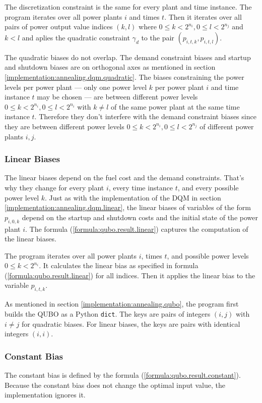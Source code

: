 The discretization constraint is the same for every plant and time instance.
The program iterates over all power plants $i$ and times $t$.
Then it iterates over all pairs of power output value indices $(k, l)$ where $0 \leq k < 2^{n_i}, 0 \leq l < 2^{n_j}$ and $k < l$ and aplies the quadratic constraint $\gamma_d$ to the pair $(p_{i, t, k}, p_{i, t, l})$.

The quadratic biases do not overlap.
The demand constraint biases and startup and shutdown biases are on orthogonal axes as mentioned in section \ref{implementation:annealing.dqm.quadratic}.
The biases constraining the power levels per power plant --- only one power level $k$ per power plant $i$ and time instance $t$ may be chosen --- are between different power levels $0 \leq k < 2^{n_i}, 0 \leq l < 2^{n_i}$ with $k \neq l$ of the same power plant at the same time instance $t$.
Therefore they don't interfere with the demand constraint biases since they are between different power levels $0 \leq k < 2^{n_i}, 0 \leq l < 2^{n_j}$ of different power plants $i, j$.

\subsubsection{Linear Biases}
\label{implementation:annealing.qubo.linear}

The linear biases depend on the fuel cost and the demand constraints.
That's why they change for every plant $i$, every time instance $t$, and every possible power level $k$.
Just as with the implementation of the DQM in section \ref{implementation:annealing.dqm.linear}, the linear biases of variables of the form $p_{i, 0, k}$ depend on the startup and shutdown costs and the initial state of the power plant $i$.
The formula (\ref{formula:qubo.result.linear}) captures the computation of the linear biases.

The program iterates over all power plants $i$, times $t$, and possible power levels $0 \leq k < 2^{n_i}$.
It calculates the linear bias as specified in formula (\ref{formula:qubo.result.linear}) for all indices.
Then it applies the linear bias to the variable $p_{i, t, k}$.

As mentioned in section \ref{implementation:annealing.qubo}, the program first builds the QUBO as a Python \texttt{dict}.
The keys are pairs of integers $(i, j)$ with $i \neq j$ for quadratic biases.
For linear biases, the keys are pairs with identical integers $(i, i)$.

\subsubsection{Constant Bias}
\label{implementation:annealing.qubo.constant}

The constant bias is defined by the formula (\ref{formula:qubo.result.constant}).
Because the constant bias does not change the optimal input value, the implementation ignores it.
